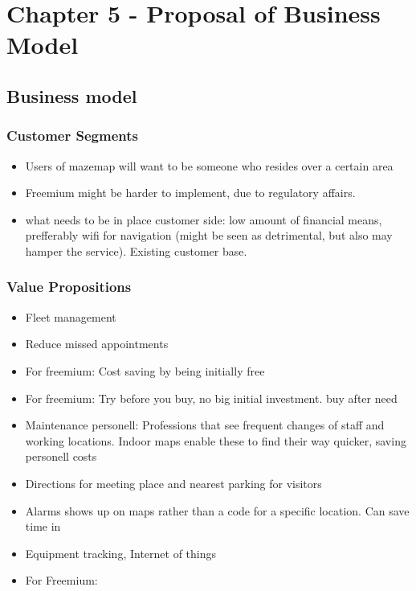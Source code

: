 \chapter{Chapter 5 - Proposal of Business Model}
\section{Business model}
\subsection{Customer Segments}

\begin{itemize}
    \item Users of mazemap will want to be someone who resides over a certain area
    \item Freemium might be harder to implement, due to regulatory affairs.
    \item what needs to be in place customer side: low amount of financial means, prefferably wifi for navigation (might be seen as detrimental, but also may hamper the service). Existing customer base. 
\end{itemize}

\subsection{Value Propositions}

\begin{itemize}
    \item  Fleet management
    \item Reduce missed appointments
    \item For freemium: Cost saving by being initially free
    \item For freemium: Try before you buy, no big initial investment. buy after need
    \item Maintenance personell: Professions that see frequent changes of staff and working locations. Indoor maps enable these to find their way quicker, saving personell costs
    \item Directions for meeting place and nearest parking for visitors
    \item Alarms shows up on maps rather than a code for a specific location. Can save time in 
    \item Equipment tracking, Internet of things
    \item For Freemium: 
\end{itemize}

